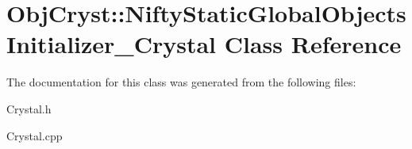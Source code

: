 \hypertarget{class_obj_cryst_1_1_nifty_static_global_objects_initializer___crystal}{}\section{Obj\+Cryst\+::Nifty\+Static\+Global\+Objects\+Initializer\+\_\+\+Crystal Class Reference}
\label{class_obj_cryst_1_1_nifty_static_global_objects_initializer___crystal}


The documentation for this class was generated from the following files\+:\begin{DoxyCompactItemize}
\item 
Crystal.\+h\item 
Crystal.\+cpp\end{DoxyCompactItemize}
